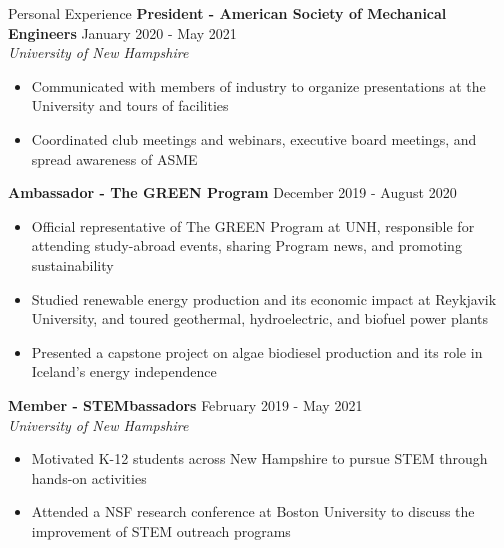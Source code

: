 \documentclass{resume}
\begin{document}
\begin{rSection}{Personal Experience}
    {\bf President - American Society of Mechanical Engineers} \hfill {January 2020 - May 2021}
    \\ {\em University of New Hampshire}
    \vspace{-0.5em}
    \begin{itemize}[label={\tiny\raisebox{1ex}{\textbullet}}, noitemsep]
        \item Communicated with members of industry to organize presentations at the University and tours of facilities
        \item Coordinated club meetings and webinars, executive board meetings, and spread awareness of ASME 
    \end{itemize}
    \vspace{-0.4em}
    {\bf Ambassador - The GREEN Program} \hfill {December 2019 - August 2020}
    \vspace{-0.5em}
    \begin{itemize}[label={\tiny\raisebox{1ex}{\textbullet}}, noitemsep]
        \item Official representative of The GREEN Program at UNH, responsible for attending study-abroad events, sharing Program news, and promoting sustainability
        \item Studied renewable energy production and its economic impact at Reykjavik University, and toured geothermal, hydroelectric, and biofuel power plants
        \item Presented a capstone project on algae biodiesel production and its role in Iceland's energy independence
    \end{itemize}
    \vspace{-0.4em}
    {\bf Member - STEMbassadors} \hfill {{February 2019 - May 2021}}
    \\ {\em University of New Hampshire}
    \vspace{-0.5em}
    \begin{itemize}[label={\tiny\raisebox{1ex}{\textbullet}}, noitemsep]
        \item Motivated K-12 students across New Hampshire to pursue STEM through hands-on activities
        \item Attended a NSF research conference at Boston University to discuss the improvement of STEM outreach programs
    \end{itemize}
    \vspace{-0.4em}
\end{rSection}
\end{document}
